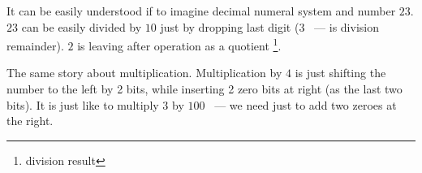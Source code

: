 
\label{division_by_shifting}
{It can be easily understood if to imagine decimal numeral system and number $23$.
$23$ can be easily divided by $10$ just by dropping last digit ($3$ ~--- is division remainder). 
$2$ is leaving after operation as a quotient
\footnote{division result}.}

{The same story about multiplication.
Multiplication by $4$ is just shifting the number to the left by 2 bits,
while inserting 2 zero bits at right (as the last two bits).
It is just like to multiply $3$ by $100$ ~--- we need just to add two zeroes at the right.}


